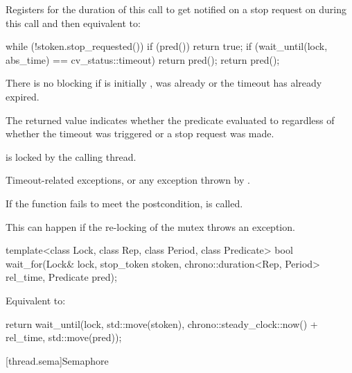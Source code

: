 \begin{itemdescr}
\pnum
\effects
Registers for the duration of this call 
to get notified on a stop request on 
during this call and then equivalent to:
\begin{codeblock}
while (!stoken.stop_requested()) {
  if (pred())
    return true;
  if (wait_until(lock, abs_time) == cv_status::timeout)
    return pred();
}
return pred();
\end{codeblock}

\pnum
\begin{note}
There is no blocking if  is initially ,
 was already 
or the timeout has already expired.
\end{note}

\pnum
\begin{note}
The returned value indicates whether the predicate evaluated to 
regardless of whether the timeout was triggered or a stop request was made.
\end{note}

\pnum
\ensures
{} is locked by the calling thread.

\pnum
\throws
Timeout-related exceptions,
or any exception thrown by .

\pnum
\remarks
If the function fails to meet the postcondition,
 is called.
\begin{note}
This can happen if the re-locking of the mutex throws an exception.
\end{note}
\end{itemdescr}

\begin{itemdecl}
template<class Lock, class Rep, class Period, class Predicate>
  bool wait_for(Lock& lock, stop_token stoken,
                chrono::duration<Rep, Period> rel_time, Predicate pred);
\end{itemdecl}

\begin{itemdescr}
\pnum
\effects
Equivalent to:
\begin{codeblock}
return wait_until(lock, std::move(stoken), chrono::steady_clock::now() + rel_time,
                  std::move(pred));
\end{codeblock}
\end{itemdescr}

[thread.sema]{Semaphore}

